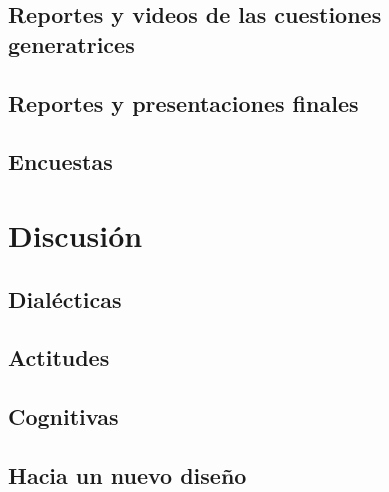 \documentclass[spanish,]{book}
\begin{document}
\hypertarget{reportes-y-videos-de-las-cuestiones-generatrices}{%
\section{Reportes y videos de las cuestiones generatrices}\label{reportes-y-videos-de-las-cuestiones-generatrices}}

\hypertarget{reportes-y-presentaciones-finales}{%
\section{Reportes y presentaciones finales}\label{reportes-y-presentaciones-finales}}

\hypertarget{encuestas}{%
\section{Encuestas}\label{encuestas}}

\hypertarget{discusiuxf3n}{%
\chapter{Discusión}\label{discusiuxf3n}}

\hypertarget{dialuxe9cticas-1}{%
\section{Dialécticas}\label{dialuxe9cticas-1}}

\hypertarget{actitudes-1}{%
\section{Actitudes}\label{actitudes-1}}

\hypertarget{cognitivas}{%
\section{Cognitivas}\label{cognitivas}}

\hypertarget{hacia-un-nuevo-diseuxf1o}{%
\section{Hacia un nuevo diseño}\label{hacia-un-nuevo-diseuxf1o}}


\end{document}
